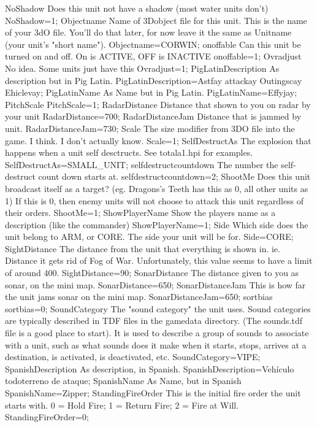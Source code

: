 \documentclass[a4paper,10pt]{article}
\begin{document}
NoShadow 	Does this unit not have a shadow (most water units don't) 	NoShadow=1;
Objectname 	Name of 3Dobject file for this unit.  This is the name of your 3dO file. You'll do that later, for now leave it the same as Unitname (your unit's "short name"). 	Objectname=CORWIN;
onoffable 	Can this unit be turned on and off. On is ACTIVE, OFF is INACTIVE 	onoffable=1;
Ovradjust 	No idea. Some units just have this 	Ovradjust=1;
PigLatinDescription 	As description but in Pig Latin. 	PigLatinDescription=Astfay attackay Outingscay Ehiclevay;
PigLatinName 	As Name but in Pig Latin. 	PigLatinName=Effyjay;
PitchScale 		PitchScale=1;
RadarDistance 	Distance that shown to you on radar by your unit 	RadarDistance=700;
RadarDistanceJam 	Distance that is jammed by unit. 	RadarDistanceJam=730;
Scale 	The size modifier from 3DO file into the game. I think.  I don't actually know. 	Scale=1;
SelfDestructAs 	The explosion that happens when a unit self desctructs. See totala1.hpi for examples. 	SelfDestructAs=SMALL\_UNIT;
selfdestructcountdown 	The number the self-destruct count down starts at. 	selfdestructcountdown=2;
ShootMe 	Does this unit broadcast itself as a target? (eg. Dragons's Teeth has this as 0, all other units as 1)  If this is 0, then enemy units will not choose to attack this unit regardless of their orders. 	ShootMe=1;
ShowPlayerName 	Show the players name as a description (like the commander) 	ShowPlayerName=1;
Side 	Which side does the unit belong to ARM, or CORE.   The side your unit will be for.   	Side=CORE;
SightDistance 	The distance from the unit that everything is shown in. ie. Distance it gets rid of Fog of War.  Unfortunately, this value seems to have a limit of around 400. 	SightDistance=90;
SonarDistance 	The distance given to you as sonar, on the mini map. 	SonarDistance=650;
SonarDistanceJam 	This is how far the unit jams sonar on the mini map. 	SonarDistanceJam=650;
sortbias 		sortbias=0;
SoundCategory 	The "sound category" the unit uses.   Sound categories are typically described in TDF files in the gamedata directory.  (The sounds.tdf file is a good place to start).  It is used to describe a group of sounds to associate with a unit, such as what sounds does it make when it starts, stops, arrives at a destination, is activated, is deactivated, etc. 	SoundCategory=VIPE;
SpanishDescription 	As description, in Spanish. 	SpanishDescription=Vehículo todoterreno de ataque;
SpanishName 	As Name, but in Spanish 	SpanishName=Zipper;
StandingFireOrder 	This is the initial fire order the unit starts with.  0 = Hold Fire; 1 = Return Fire; 2 = Fire at Will. 	StandingFireOrder=0;
\end{document}
